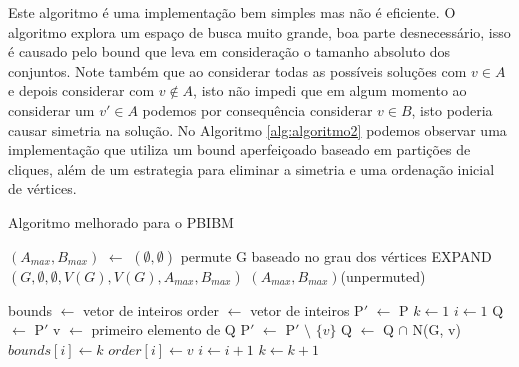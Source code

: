 Este algoritmo é uma implementação bem simples mas não é eficiente. O algoritmo explora um espaço de busca muito grande, boa parte desnecessário, isso é causado pelo bound que leva em consideração o tamanho absoluto dos conjuntos. Note também que ao considerar todas as possíveis soluções com $v \in A$ e depois considerar com $v \notin A$, isto não impedi que em algum momento ao considerar um $v' \in A$ podemos por consequência considerar $v \in B$, isto poderia causar simetria na solução. No Algoritmo \ref{alg:algoritmo2} podemos observar uma implementação que utiliza um bound aperfeiçoado baseado em partições de cliques, além de um estrategia para eliminar a simetria e uma ordenação inicial de vértices.  
    
    \begin{algorithm}[]
        \caption{Algoritmo melhorado para o PBIBM}
        \label{alg:algoritmo2}
            \begin{algorithmic}[1]
                    \State $(A_{max}, B_{max})$ $\gets$ $(\emptyset,\emptyset)$
                    \State permute G baseado no grau dos vértices \label{permute}
                    \State EXPAND$(G,\emptyset,\emptyset,V(G),V(G),A_{max},B_{max})$
                    \State \Return $(A_{max}, B_{max})$(unpermuted)
                \EndFunction
               
                    \State bounds $\gets$ vetor de inteiros
                    \State order $\gets$ vetor de inteiros
                    \State P$'$ $\gets$ P
                    \State $k \gets 1$
                    \State $i \gets 1$
                        \State Q $\gets$ P$'$
                            \State v $\gets$ primeiro elemento de Q
                            \State P$'$ $\gets$ P$'$ $\setminus$ $\{v\}$
                            \State Q $\gets$ Q $\cap$ N(G, v)
                            \State $bounds[i] \gets k$
                            \State $order[i] \gets v$
                            \State $i \gets i + 1$
                        \EndWhile
                        \State $k \gets k + 1$
                    \EndWhile
                \EndFunction
              

\end{algorithmic}
\end{algorithm}
